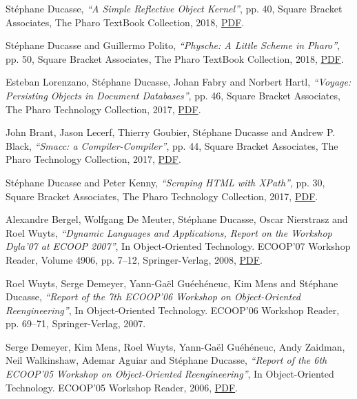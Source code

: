 \documentclass{article}
\newcommand{\czauthors}[1]{#1}
\newcommand{\cztitle}[1]{\emph{``#1''}}
\newcommand{\czbooktitle}[1]{#1}
\begin{document}
\begin{itemize}

	\pub  \czauthors{St\'ephane Ducasse},  \cztitle{A Simple Reflective Object Kernel}, pp. 40, Square Bracket Associates, The Pharo TextBook Collection, 2018, \href{http://rmod-files.lille.inria.fr/Team/Books/2018-09-02-ReflectiveCore.pdf}{PDF}.

	\pub  \czauthors{St\'ephane Ducasse and Guillermo Polito},  \cztitle{Physche: A Little Scheme in Pharo}, pp. 50, Square Bracket Associates, The Pharo TextBook Collection, 2018, \href{http://rmod-files.lille.inria.fr/Team/Books/2018-08-28-Physche.pdf}{PDF}.

	\pub  \czauthors{Esteban Lorenzano, St\'ephane Ducasse, Johan Fabry and Norbert Hartl},  \cztitle{Voyage: Persisting Objects in Document Databases}, pp. 46, Square Bracket Associates, The Pharo Technology Collection, 2017, \href{http://rmod-files.lille.inria.fr/Team/Books/2018-09-02-voyage.pdf}{PDF}.

	\pub  \czauthors{John Brant, Jason Lecerf, Thierry Goubier, St\'ephane Ducasse and Andrew P. Black},  \cztitle{Smacc: a Compiler-Compiler}, pp. 44, Square Bracket Associates, The Pharo Technology Collection, 2017, \href{http://rmod-files.lille.inria.fr/Team/Books/2018-10-21-Smacc-Compiler.pdf}{PDF}.

	\pub  \czauthors{St\'ephane Ducasse and Peter Kenny},  \cztitle{Scraping HTML with XPath}, pp. 30, Square Bracket Associates, The Pharo Technology Collection, 2017, \href{http://rmod-files.lille.inria.fr/Team/Books/2018-09-02-scrapingbook.pdf}{PDF}.

	\pub  \czauthors{Alexandre Bergel, Wolfgang De Meuter, St\'ephane Ducasse, Oscar Nierstrasz and Roel Wuyts},  \cztitle{Dynamic Languages and Applications, Report on the Workshop {Dyla}'07 at {ECOOP} 2007},  In \czbooktitle{Object-Oriented Technology. ECOOP'07 Workshop Reader}, Volume 4906, pp. 7--12, Springer-Verlag, 2008, \href{http://rmod-files.lille.inria.fr/Team/Texts/Papers//Berg08b-Dyla07Report.pdf}{PDF}.

	\pub  \czauthors{Roel Wuyts, Serge Demeyer, Yann-Ga\"el Gu\'e{e}h\'{e}neuc, Kim Mens and St\'ephane Ducasse},  \cztitle{Report of the 7th ECOOP'06 Workshop on Object-Oriented Reengineering},  In \czbooktitle{Object-Oriented Technology. ECOOP'06 Workshop Reader}, pp. 69--71, Springer-Verlag, 2007.

	\pub  \czauthors{Serge Demeyer, Kim Mens, Roel Wuyts, Yann-Ga\"el Gu\'{e}h\'{e}neuc, Andy Zaidman, Neil Walkinshaw, Ademar Aguiar and St\'ephane Ducasse},  \cztitle{Report of the 6th ECOOP'05 Workshop on Object-Oriented Reengineering},  In \czbooktitle{Object-Oriented Technology. ECOOP'05 Workshop Reader}, 2006, \href{http://rmod-files.lille.inria.fr/Team/Texts/Papers//Deme06a-ECOOP2006-WOOR.pdf}{PDF}.


\end{itemize}
\end{document}
